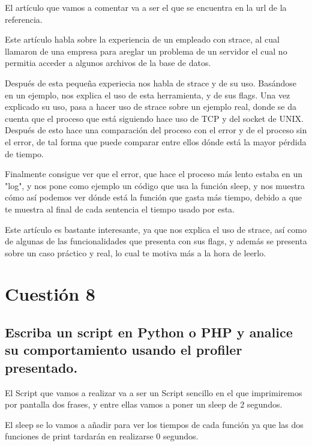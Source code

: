El artículo que vamos a comentar va a ser el que se encuentra en la url de la referencia.\cite{strace}

Este artículo habla sobre la experiencia de un empleado con strace, al cual llamaron de una empresa para areglar un problema de un servidor el cual no permitia acceder a algunos archivos de la base de datos.

Después de esta pequeña experiecia nos habla de strace y de su uso.
Basándose en un ejemplo, nos explica el uso de esta herramienta, y de sus flags.
Una vez explicado su uso, pasa a hacer uso de strace sobre un ejemplo real, donde se da cuenta que el proceso que está siguiendo hace uso de TCP y del socket de UNIX.
Después de esto hace una comparación del proceso con el error y de el proceso sin el error, de tal forma que puede comparar entre ellos dónde está la mayor pérdida de tiempo.

Finalmente consigue ver que el error, que hace el proceso más lento estaba en un "log", y nos pone como ejemplo un código que usa la función sleep, y nos muestra cómo así podemos ver dónde está la función que gasta más tiempo, debido a que te muestra al final de cada sentencia el tiempo usado por esta.

\setlength{\parskip}{10pt}

Este artículo es bastante interesante, ya que nos explica el uso de strace, así como de algunas de las funcionalidades que presenta con sus flags, y además se presenta sobre un caso práctico y real, lo cual te motiva más a la hora de leerlo.

\section{Cuestión 8}

\subsection{\Large Escriba un script en Python o PHP y analice su comportamiento usando el profiler presentado.}

El Script que vamos a realizar va a ser un Script sencillo en el que imprimiremos por pantalla dos frases, y entre ellas vamos a poner un sleep de 2 segundos.

El sleep se lo vamos a añadir para ver los tiempos de cada función ya que las dos funciones de print tardarán en realizarse 0 segundos.


